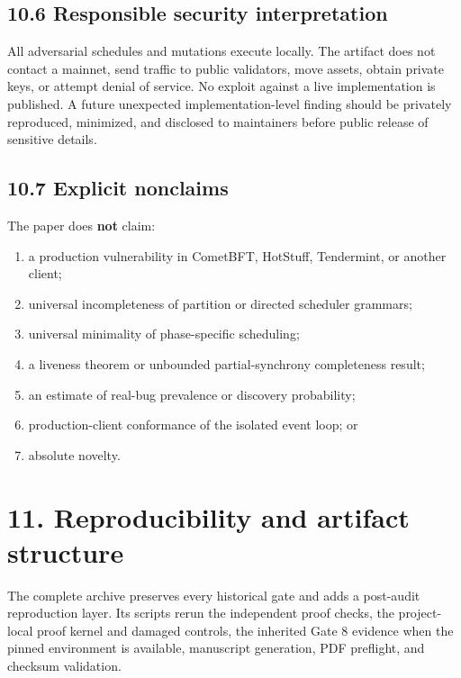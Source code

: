 \documentclass[10pt,a4paper]{article}
\newcommand{\tightlist}{\setlength{\itemsep}{0pt}\setlength{\parskip}{0pt}}
\begin{document}
\subsection{10.6 Responsible security
interpretation}\label{responsible-security-interpretation}

All adversarial schedules and mutations execute locally. The artifact
does not contact a mainnet, send traffic to public validators, move
assets, obtain private keys, or attempt denial of service. No exploit
against a live implementation is published. A future unexpected
implementation-level finding should be privately reproduced, minimized,
and disclosed to maintainers before public release of sensitive details.

\subsection{10.7 Explicit nonclaims}\label{explicit-nonclaims}

The paper does \textbf{not} claim:

\begin{enumerate}
\def\labelenumi{\arabic{enumi}.}
\tightlist
\item
  a production vulnerability in CometBFT, HotStuff, Tendermint, or
  another client;
\item
  universal incompleteness of partition or directed scheduler grammars;
\item
  universal minimality of phase-specific scheduling;
\item
  a liveness theorem or unbounded partial-synchrony completeness result;
\item
  an estimate of real-bug prevalence or discovery probability;
\item
  production-client conformance of the isolated event loop; or
\item
  absolute novelty.
\end{enumerate}

\section{11. Reproducibility and artifact
structure}\label{reproducibility-and-artifact-structure}

The complete archive preserves every historical gate and adds a
post-audit reproduction layer. Its scripts rerun the independent proof
checks, the project-local proof kernel and damaged controls, the
inherited Gate 8 evidence when the pinned environment is available,
manuscript generation, PDF preflight, and checksum validation.
\end{document}
